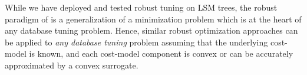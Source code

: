 While we have deployed and tested robust tuning on LSM trees, the robust
    paradigm of {\Endure} is a generalization of a minimization problem which is
    at the heart of any database tuning problem.
Hence, similar robust optimization approaches can be applied to \emph{any
    database tuning} problem assuming that the underlying cost-model is known,
    and each cost-model component is convex or can be accurately approximated by
    a convex surrogate. 

